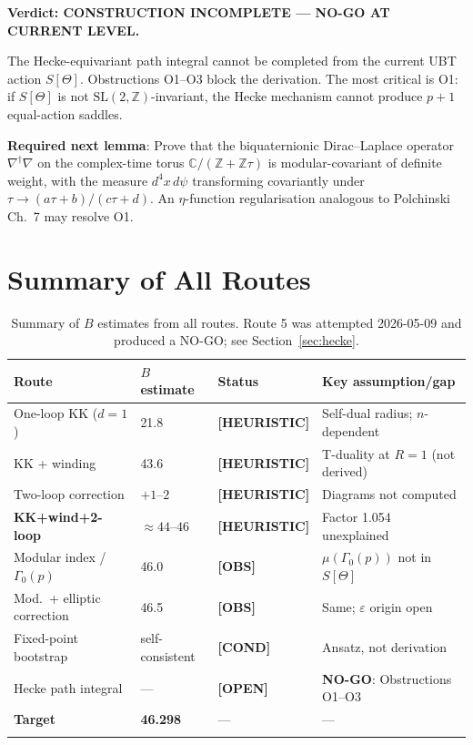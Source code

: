 \documentclass[12pt,a4paper]{article}
\theoremstyle{definition}
\theoremstyle{remark}
\newcommand{\heur}{\textcolor{orange!80!black}{\textbf{[HEURISTIC]}}}
\newcommand{\cond}{\textcolor{blue!70!black}{\textbf{[COND]}}}
\newcommand{\openp}{\textcolor{red!70!black}{\textbf{[OPEN]}}}
\newcommand{\obs}{\textcolor{blue!50!black}{\textbf{[OBS]}}}
\begin{document}
\begin{warnbox}
\textbf{Verdict: CONSTRUCTION INCOMPLETE --- NO-GO AT CURRENT LEVEL.}

The Hecke-equivariant path integral cannot be completed from the current
UBT action $S[\Theta]$.  Obstructions O1--O3 block the derivation.
The most critical is O1: if $S[\Theta]$ is not $\mathrm{SL}(2,\mathbb{Z})$-invariant,
the Hecke mechanism cannot produce $p+1$ equal-action saddles.

\medskip
\textbf{Required next lemma}: Prove that the biquaternionic Dirac--Laplace
operator $\nabla^\dagger\nabla$ on the complex-time torus
$\mathbb{C}/(\mathbb{Z}+\mathbb{Z}\tau)$ is modular-covariant of definite
weight, with the measure $d^4x\,d\psi$ transforming covariantly under
$\tau \to (a\tau+b)/(c\tau+d)$.  An $\eta$-function regularisation analogous
to Polchinski Ch.~7 may resolve O1.
\end{warnbox}

\section{Summary of All Routes}
\label{sec:summary}

\begin{longtable}{p{3.5cm}p{2.5cm}p{3.5cm}p{4cm}}
\toprule
\textbf{Route} & \textbf{$B$ estimate} & \textbf{Status} & \textbf{Key assumption/gap} \\
\midrule
One-loop KK ($d=1$) & 21.8 & \heur & Self-dual radius; $n$-dependent \\
KK + winding & 43.6 & \heur & T-duality at $R=1$ (not derived) \\
Two-loop correction & $+1$--$2$ & \heur & Diagrams not computed \\
\textbf{KK+wind+2-loop} & $\approx 44$--$46$ & \heur & Factor 1.054 unexplained \\
Modular index / $\Gamma_0(p)$ & 46.0 & \obs & $\mu(\Gamma_0(p))$ not in $S[\Theta]$ \\
Mod.\ + elliptic correction & 46.5 & \obs & Same; $\varepsilon$ origin open \\
Fixed-point bootstrap & self-consistent & \cond & Ansatz, not derivation \\
Hecke path integral & --- & \openp & \textbf{NO-GO}: Obstructions O1--O3 \\
\midrule
\textbf{Target} & \textbf{46.298} & --- & --- \\
\bottomrule
\caption{Summary of $B$ estimates from all routes.  Route 5 was attempted
2026-05-09 and produced a NO-GO; see Section~\ref{sec:hecke}.}
\label{tab:summary}
\end{longtable}
\end{document}
